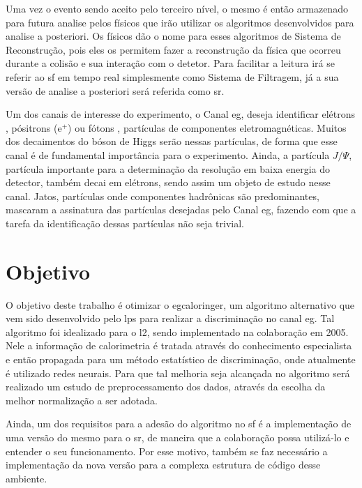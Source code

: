 Uma vez o evento sendo aceito pelo terceiro nível, o mesmo é então armazenado
para futura analise pelos físicos que irão utilizar os algoritmos desenvolvidos 
para analise a posteriori. Os físicos dão o nome para esses algoritmos de Sistema de
Reconstrução, pois eles os permitem fazer a reconstrução da física que ocorreu
durante a colisão e sua interação com o detetor. Para facilitar a leitura irá se 
referir ao \glsdesc{sf} em tempo real simplesmente como Sistema de 
Filtragem, já a sua versão de analise a posteriori será referida como \glsdesc{sr}.

Um dos canais de interesse do experimento, o Canal \acrshort{eg},
deseja identificar elétrons , pósitrons (e$^+$)
ou fótons , 
partículas de componentes eletromagnéticas. Muitos dos decaimentos do bóson de
Higgs serão nessas partículas, de forma que esse canal é de fundamental
importância para o experimento. Ainda, a partícula $J/\Psi$, partícula importante
para a determinação da resolução em baixa energia do detector, 
também decai em elétrons, sendo assim um objeto de estudo nesse canal.
Jatos, partículas onde componentes hadrônicas são predominantes, 
mascaram a assinatura das partículas desejadas pelo Canal \acrshort{eg}, fazendo 
com que a tarefa da identificação dessas partículas não seja trivial.

\section{Objetivo} %

O objetivo deste trabalho é otimizar o \gls{egcaloringer},
um algoritmo alternativo que vem sido desenvolvido pelo \gls{lps}
para realizar a discriminação 
no canal \acrshort{eg}. Tal algoritmo foi idealizado para o \gls{l2}, 
sendo implementado na colaboração em 2005.
Nele a informação de calorimetria é tratada através do conhecimento especialista
e então propagada para um método estatístico 
de discriminação, onde atualmente é utilizado redes neurais. 
Para que tal melhoria seja alcançada no
algoritmo será realizado um estudo de preprocessamento dos dados,
através da escolha da melhor normalização a ser adotada.

Ainda, um dos requisitos para a adesão do algoritmo no \glsdesc{sf} é a
implementação de uma versão do mesmo para o \glsdesc{sr},
de maneira  que a colaboração possa utilizá-lo e entender o seu
funcionamento. Por esse motivo, também se faz necessário a implementação 
da nova versão para a complexa estrutura de código desse ambiente.

